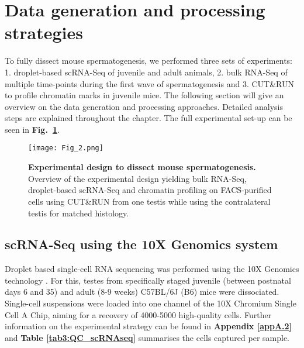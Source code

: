 
\section{Data generation and processing strategies}
\label{sec3:clustering}

To fully dissect mouse spermatogenesis, we performed three sets of experiments: 1. droplet-based scRNA-Seq of juvenile and adult animals, 2. bulk RNA-Seq of multiple time-points during the first wave of spermatogenesis and 3. CUT\&{}RUN to profile chromatin marks in juvenile mice. The following section will give an overview on the data generation and processing approaches. Detailed analysis steps are explained throughout the chapter. The full experimental set-up can be seen in \textbf{Fig.~\ref{fig3:experimental_design}}.

\begin{figure}[!h]
\centering
\texttt{[image: Fig\_2.png]}
\caption[Experimental design to dissect mouse spermatogenesis]{\textbf{Experimental design to dissect mouse spermatogenesis.}\\
Overview of the experimental design yielding bulk RNA-Seq, droplet-based scRNA-Seq and chromatin profiling on FACS-purified cells using CUT\&{}RUN from one testis while using the contralateral testis for matched histology.}
\label{fig3:experimental_design}
\end{figure}

\subsection{scRNA-Seq using the 10X Genomics\texttrademark{} system}

Droplet based single-cell RNA sequencing was performed using the 10X Genomics\texttrademark{} technology \citep{Zheng2017}. For this, testes from specifically staged juvenile (between postnatal days 6 and 35) and adult (8-9 weeks) C57BL/6J (B6) mice were dissociated. Single-cell suspensions were loaded into one channel of the 10X Chromium\texttrademark{} Single Cell A Chip, aiming for a recovery of 4000-5000 high-quality cells. Further information on the experimental strategy can be found in \textbf{Appendix \ref{appA.2}} and \textbf{Table \ref{tab3:QC_scRNAseq}} summarises the cells captured per sample.

\newpage

